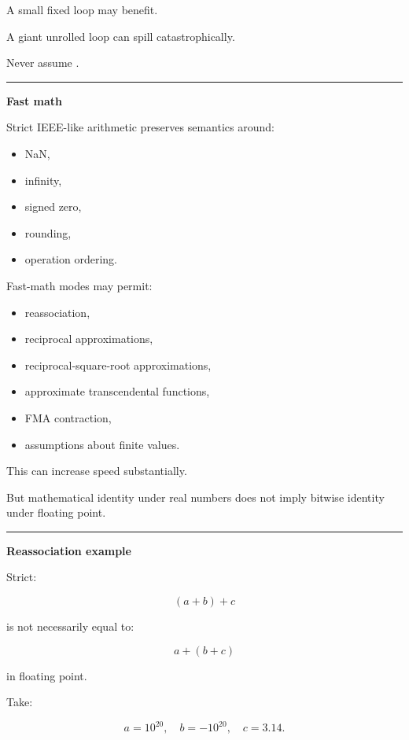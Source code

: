 A small fixed loop may benefit.

A giant unrolled loop can spill catastrophically.

Never assume .

\begin{center}\rule{0.5\linewidth}{0.5pt}\end{center}

\textbf{Fast math}

Strict IEEE-like arithmetic preserves semantics around:

\begin{itemize}
\tightlist
\item
  NaN,
\item
  infinity,
\item
  signed zero,
\item
  rounding,
\item
  operation ordering.
\end{itemize}

Fast-math modes may permit:

\begin{itemize}
\tightlist
\item
  reassociation,
\item
  reciprocal approximations,
\item
  reciprocal-square-root approximations,
\item
  approximate transcendental functions,
\item
  FMA contraction,
\item
  assumptions about finite values.
\end{itemize}

This can increase speed substantially.

But mathematical identity under real numbers does not imply bitwise identity under floating point.

\begin{center}\rule{0.5\linewidth}{0.5pt}\end{center}

\textbf{Reassociation example}

Strict:

\[
(a+b)+c
\]

is not necessarily equal to:

\[
a+(b+c)
\]

in floating point.

Take:

\[
a=10^{20},
\quad
b=-10^{20},
\quad
c=3.14.
\]

